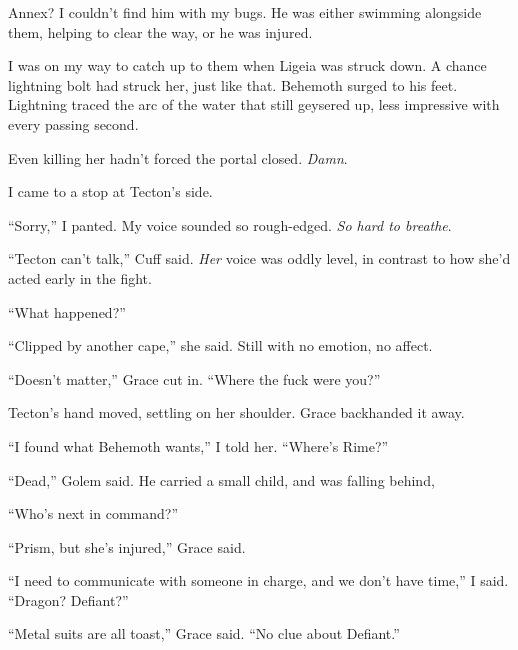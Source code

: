 Annex?  I couldn't find him with my bugs.  He was either swimming alongside them, helping to clear the way, or he was injured.



I was on my way to catch up to them when Ligeia was struck down.  A chance lightning bolt had struck her, just like that.  Behemoth surged to his feet.  Lightning traced the arc of the water that still geysered up, less impressive with every passing second.



Even killing her hadn't forced the portal closed.  \emph{Damn}.



I came to a stop at Tecton's side.



``Sorry,'' I panted.  My voice sounded so rough-edged.  \emph{So hard to breathe}.



``Tecton can't talk,'' Cuff said.  \emph{Her} voice was oddly level, in contrast to how she'd acted early in the fight.



``What happened?''



``Clipped by another cape,'' she said.  Still with no emotion, no affect.



``Doesn't matter,'' Grace cut in.  ``Where the fuck were you?''



Tecton's hand moved, settling on her shoulder.  Grace backhanded it away.



``I found what Behemoth wants,'' I told her.  ``Where's Rime?''



``Dead,'' Golem said.  He carried a small child, and was falling behind,



``Who's next in command?''



``Prism, but she's injured,'' Grace said.



``I need to communicate with someone in charge, and we don't have time,'' I said.  ``Dragon?  Defiant?''



``Metal suits are all toast,'' Grace said.  ``No clue about Defiant.''



